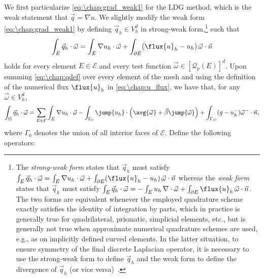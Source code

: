 We first particularize \cref{eq:\chap:grad_weak1} for the LDG method, which is the weak statement that $\vec{q} = \nabla u$. We slightly modify the weak form \cref{eq:\chap:grad_weak1} by defining $\vec{q}_h \in V_h^d$ in strong-weak form,\footnote{The \textit{strong-weak form} states that $\vec{q}_h$ must satisfy $\int_E \vec{q}_h \cdot \vec{\omega} = \int_E \nabla u_h \cdot \vec{\omega} + \int_{\partial E} (\flux{u}_h - u_h)\, \vec{\omega} \cdot \vec{n}$ whereas the \textit{weak form} states that $\vec{q}_h$ must satisfy $\int_E \vec{q}_h \cdot \vec{\omega} = -\int_E u_h\,\nabla \cdot \vec{\omega} + \int_{\partial E} \flux{u}_h \, \vec{\omega} \cdot \vec{n}$. The two forms are equivalent whenever the employed quadrature scheme exactly satisfies the identity of integration by parts, which in practice is generally true for quadrilateral, prismatic, simplicial elements, etc., but is generally not true when approximate numerical quadrature schemes are used, e.g., as on implicitly defined curved elements. In the latter situation, to ensure symmetry of the final discrete Laplacian operator, it is necessary to use the strong-weak form to define $\vec{q}_h$ and the weak form to define the divergence of $\vec{q}_h$ (or vice versa)~\cite{Saye_17_01}.} such that
\begin{equation}\label{eq:\chap:qdef}
\int_E \vec{q}_h \cdot \vec{\omega} = \int_E \nabla u_h \cdot \vec{\omega} + \int_{\partial E} (\flux{u}_h - u_h)\, \vec{\omega} \cdot \vec{n}
\end{equation}
holds for every element $E \in {\mathcal E}$ and every test function $\vec{\omega} \in [\mathcal{Q}_p(E)]^d$. Upon summing \cref{eq:\chap:qdef} over every element of the mesh and using the definition of the numerical flux $\flux{u}_h$ in \cref{eq:\chap:u_flux}, we have that, for any $\vec \omega \in V_h^d$,
\begin{equation}\label{eq:\chap:qdefintegral}
\int_\Omega \vec{q}_h \cdot \vec{\omega} = \sum_{E \in \mathcal E} \int_E \nabla u_h \cdot \vec{\omega} - \int_{\Gamma_0} \jump{u_h} \cdot \left(\avg{\vec{\omega}} + \vec{\beta} \jump{\vec{\omega}}\right) + \int_{\Gamma_D} (g - u_h^-) \vec{\omega}^- \cdot \vec{n},
\end{equation}
where $\Gamma_0$ denotes the union of all interior faces of $\mathcal{E}$.
Define the following operators:

